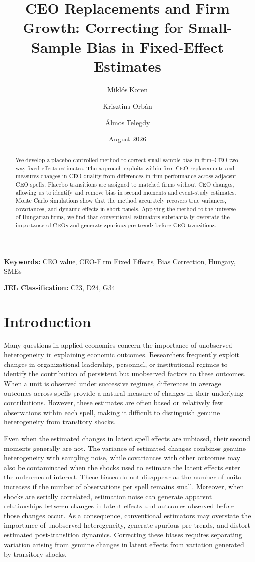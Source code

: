 \documentclass[sigconf,nonacm]{acmart}
\title{CEO Replacements and Firm Growth: Correcting for Small-Sample Bias in Fixed-Effect Estimates}
\author{Miklós Koren}
\affiliation{\institution{Central European University, ELTE Centre for Economic and Regional Studies, CEPR and CESifo}\country{Hungary}}
\author{Krisztina Orbán}
\affiliation{\institution{Monash University}\country{Australia}}
\author{Álmos Telegdy}
\affiliation{\institution{Corvinus University of Budapest}\country{Hungary}}
\date{August 2026}
\begin{document}
\begin{abstract}
\noindent We develop a placebo-controlled method to correct small-sample bias in firm–CEO two way fixed-effects estimates. The approach exploits within-firm CEO replacements and measures changes in CEO quality from differences in firm performance across adjacent CEO spells. Placebo transitions are assigned to matched firms without CEO changes, allowing us to identify and remove bias in second moments and event-study estimates. Monte Carlo simulations show that the method accurately recovers true variances, covariances, and dynamic effects in short panels. Applying the method to the universe of Hungarian firms, we find that conventional estimators substantially overstate the importance of CEOs and generate spurious pre-trends before CEO transitions.
\end{abstract}

\maketitle

\textbf{Keywords:} CEO value, CEO-Firm Fixed Effects, Bias Correction, Hungary, SMEs

\textbf{JEL Classification:} C23, D24, G34


\section{Introduction}

Many questions in applied economics concern the importance of unobserved
heterogeneity in explaining economic outcomes. Researchers frequently
exploit changes in organizational leadership, personnel, or institutional
regimes to identify the contribution of persistent but unobserved factors
to these outcomes. When a unit is observed under successive regimes,
differences in average outcomes across spells provide a natural measure of
changes in their underlying contributions. However, these estimates are
often based on relatively few observations within each spell, making it
difficult to distinguish genuine heterogeneity from transitory shocks.

Even when the estimated changes in latent spell effects are unbiased,
their second moments generally are not. The variance of estimated changes
combines genuine heterogeneity with sampling noise, while covariances with
other outcomes may also be contaminated when the shocks used to estimate
the latent effects enter the outcomes of interest. These biases do not
disappear as the number of units increases if the number of observations
per spell remains small. Moreover, when shocks are serially correlated,
estimation noise can generate apparent relationships between changes in
latent effects and outcomes observed before those changes occur. As a
consequence, conventional estimators may overstate the importance of
unobserved heterogeneity, generate spurious pre-trends, and distort
estimated post-transition dynamics. Correcting these biases requires
separating variation arising from genuine changes in latent effects from
variation generated by transitory shocks.
\end{document}
